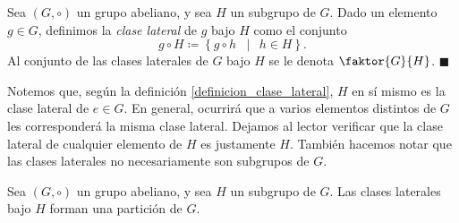 \begin{definition} \label{definicion_clase_lateral}
Sea $(G, \circ)$ un grupo abeliano, y sea $H$ un subgrupo de $G$. Dado un elemento $g \in G$, definimos la \emph{clase lateral} de $g$ bajo $H$ como el conjunto
$$g \circ H \coloneq \left\{ g \circ h \;\; \mid \;\, h \in H \right\}.$$ Al conjunto de las clases laterales de $G$ bajo $H$ se le denota $\faktor{G}{H}$.
\hfill$\blacksquare$
\end{definition}

Notemos que, según la definición \ref{definicion_clase_lateral}, $H$ en sí mismo es la clase lateral de $e \in G$. En general, ocurrirá que a varios elementos distintos de $G$ les corresponderá la misma clase lateral. Dejamos al lector verificar que la clase lateral de cualquier elemento de $H$ es justamente $H$. También hacemos notar que las clases laterales no necesariamente son subgrupos de $G$.

\begin{prop} \label{lema:rel bin}
Sea $(G, \circ)$ un grupo abeliano, y sea $H$ un subgrupo de $G$. Las clases laterales bajo $H$ forman una partición de $G$.
\end{prop}

